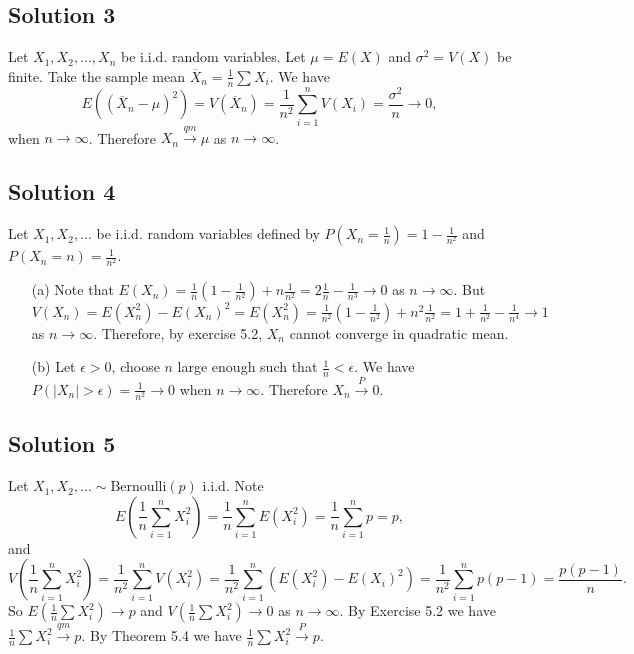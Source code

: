 \subsection*{Solution 3}

Let $X_1, X_2, ..., X_n$ be i.i.d. random variables.
Let $\mu = E(X)$ and $\sigma^2 = V(X)$ be finite.
Take the sample mean $\overline{X}_n = \frac{1}{n} \sum X_i$.
We have
\begin{equation*}
    E((\overline{X}_n - \mu)^2) = V(\overline{X}_n)
        = \frac{1}{n^2} \sum_{i = 1}^n V(X_i)
        = \frac{\sigma^2}{n} \to 0,
\end{equation*}
when $n \to \infty$.
Therefore $X_n \xrightarrow{qm} \mu$ as $n \to \infty$.


\subsection*{Solution 4}

Let $X_1, X_2, ...$ be i.i.d. random variables defined by $P(X_n = \frac{1}{n}) = 1 - \frac{1}{n^2}$ and $P(X_n = n) = \frac{1}{n^2}$.

\begin{itemize}
    \item[(a)] Note that $E(X_n) = \frac{1}{n}(1 - \frac{1}{n^2}) + n \frac{1}{n^2} = 2 \frac{1}{n} - \frac{1}{n^3} \to 0$ as $n \to \infty$.
        But $V(X_n) = E(X_n^2) - E(X_n)^2 = E(X_n^2) = \frac{1}{n^2}(1 - \frac{1}{n^2}) + n^2 \frac{1}{n^2} = 1 + \frac{1}{n^2} - \frac{1}{n^4} \to 1$ as $n \to \infty$.
        Therefore, by exercise 5.2, $X_n$ cannot converge in quadratic mean.
    \item[(b)] Let $\epsilon > 0$, choose $n$ large enough such that $\frac{1}{n} < \epsilon$.
        We have $P(|X_n| > \epsilon) = \frac{1}{n^2} \to 0$ when $n \to \infty$.
        Therefore $X_n \xrightarrow{P} 0$.
\end{itemize}


\subsection*{Solution 5}

Let $X_1, X_2, ... \sim \mathrm{Bernoulli}(p)$ i.i.d.
Note
\begin{equation*}
    E(\frac{1}{n} \sum_{i = 1}^n X_i^2) = \frac{1}{n} \sum_{i = 1}^n E(X_i^2)
        = \frac{1}{n} \sum_{i = 1}^n p
        = p,
\end{equation*}
and
\begin{equation*}
    V(\frac{1}{n} \sum_{i = 1}^n X_i^2) = \frac{1}{n^2} \sum_{i = 1}^n V(X_i^2)
        = \frac{1}{n^2} \sum_{i = 1}^n (E(X_i^2) - E(X_i)^2)
        = \frac{1}{n^2} \sum_{i = 1}^n p(p - 1)
        = \frac{p(p - 1)}{n}.
\end{equation*}
So $E(\frac{1}{n} \sum X_i^2) \to p$ and $V(\frac{1}{n} \sum X_i^2) \to 0$ as $n \to \infty$.
By Exercise 5.2 we have $\frac{1}{n} \sum X_i^2 \xrightarrow{qm} p$.
By Theorem 5.4 we have $\frac{1}{n} \sum X_i^2 \xrightarrow{P} p$.



